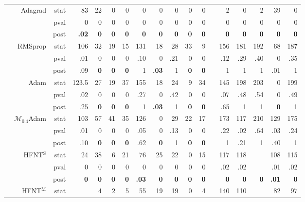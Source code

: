 \documentclass[11pt,a4paper]{article}
\begin{document}
\begin{table}
\begin{tabular}[t]{lrrrrrrrrrrrrrrrrr}
& Adagrad & stat & 83 & 22 & 0 & 0 & 0 & 0 & 0 & 0 & 0 &  & 2 & 0 & 2 & 39 & 0 \\
            &  & pval & 0 & 0 & 0 & 0 & 0 & 0 & 0 & 0 & 0 &  & 0 & 0 & 0 & 0 & 0 \\
            &  & post & \textbf{.02} & \textbf{0} & \textbf{0} & \textbf{0} & \textbf{0} & \textbf{0} & \textbf{0} & \textbf{0} & \textbf{0} &  & \textbf{0} & \textbf{0} & \textbf{0} & \textbf{0} & \textbf{0} \\
& RMSprop & stat & 106 & 32 & 19 & 15 & 131 & 18 & 28 & 33 & 9 &  & 156 & 181 & 192 & 68 & 187 \\
            &  & pval & .01 & 0 & 0 & 0 & .10 & 0 & .21 & 0 & 0 &  & .12 & .29 & .40 & 0 & .35 \\
            &  & post & .09 & \textbf{0} & \textbf{0} & \textbf{0} & 1 & \textbf{.03} & 1 & \textbf{0} & \textbf{0} &  & 1 & 1 & 1 & .01 & 1 \\
& Adam & stat & 123.5 & 27 & 19 & 37 & 155 & 18 & 24 & 9 & 34 &  & 145 & 198 & 203 & 0 & 199 \\
            &  & pval & .02 & 0 & 0 & 0 & .27 & 0 & .42 & 0 & 0 &  & .07 & .48 & .54 & 0 & .49 \\
            &  & post & .25 & \textbf{0} & \textbf{0} & \textbf{0} & 1 & \textbf{.03} & 1 & \textbf{0} & \textbf{0} &  & .65 & 1 & 1 & \textbf{0} & 1 \\
&$\mathcal{M}_{0.4}$Adam & stat & 103 & 57 & 41 & 35 & 126 & 0 & 29 & 22 & 17 &  & 173 & 117 & 210 & 129 & 175  \\ 
            & & pval & .01 & 0 & 0 & 0 & .05 & 0 & .13 & 0 & 0 &  & .22 & .02 & .64 & .03 & .24  \\ 
            & & post & .10 & \textbf{0} & \textbf{0} & \textbf{0} & .62 & \textbf{0} & 1 & \textbf{0} & \textbf{0} &  & 1 & .21 & 1 & .40 & 1  \\ 
            \cmidrule{1-2}
            \parbox[t]{3mm}{}
& HFNT$^{\text{S}}$ & stat & 24 & 38 & 6 & 21 & 76 & 25 & 22 & 0 & 15 &  & 117 & 118 &  & 108 & 115 \\
            & & pval & 0 & 0 & 0 & 0 & 0 & 0 & 0 & 0 & 0 &  & .02 & .02 &  & .01 & .02 \\
            & & post & \textbf{0} & \textbf{0} & \textbf{0} & \textbf{0} & \textbf{.03} & \textbf{0} & \textbf{0} & \textbf{0} & \textbf{0} &  & \textbf{0} & \textbf{0} & \textbf{0} & \textbf{.01} & \textbf{0} \\
& HFNT$^{\text{M}}$ & stat &  & 4 & 2 & 5 & 55 & 19 & 19 & 0 & 4 &  & 140 & 110 &  & 82 & 97 \\

\end{tabular}
\end{table}
\end{document}
